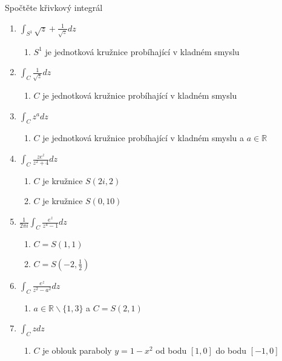 \begin{multicols}{2}
Spočtěte křivkový integrál
\begin{enumerate}
\item $\int_{S^1} \sqrt{z} + \frac{1}{\sqrt{z}} dz$
	\begin{enumerate}
	\item $S^1$ je jednotková kružnice probíhající v kladném smyslu
	\end{enumerate}
\item $\int_C \frac{1}{\sqrt{z}} dz$
	\begin{enumerate}
	\item $C$ je jednotková kružnice probíhající v kladném smyslu
	\end{enumerate}
\item $\int_C z^a dz$
	\begin{enumerate}
	\item $C$ je jednotková kružnice probíhající v kladném smyslu  a $a \in \mathbb{R}$
	\end{enumerate}
\item $\int_C \frac{z e^z}{z^2 + 4} dz$
	\begin{enumerate}
	\item $C$ je kružnice $S(2i, 2)$
	\item $C$ je kružnice $S(0,10)$
	\end{enumerate}
\item $\frac{1}{2 \pi i} \int_C \frac{e^z}{z^4 - 1} dz$
	\begin{enumerate}
	\item $C = S(1,1)$
	\item $C = S \left(-2,\frac{1}{2} \right)$
	\end{enumerate}
\item $\int_C \frac{e^z}{z^2 - a^2} dz$
	\begin{enumerate}
	\item $a \in \mathbb{R} \backslash \{ 1, 3 \}$ a $C = S(2,1)$
	\end{enumerate}
\item $\int_C z dz$
	\begin{enumerate}
	\item $C$ je oblouk paraboly $y = 1-x^2$ od bodu $[1,0]$ do bodu $[-1,0]$
	\end{enumerate}
\end{enumerate}

\separator


\end{multicols}
